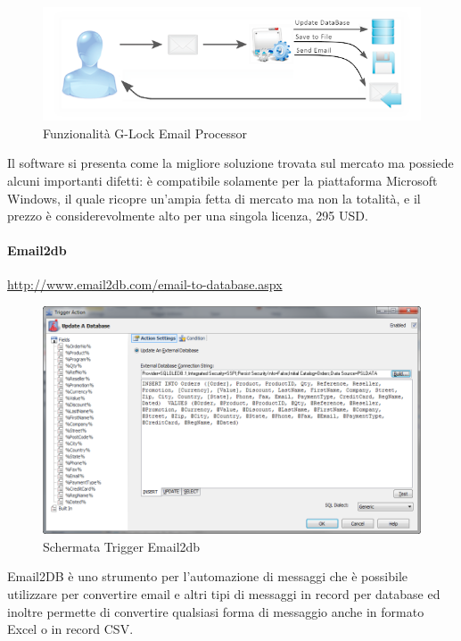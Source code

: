 \begin{figure}[H]
\centering 
\includegraphics[scale=2]{img/emailprocessor.png} 
\caption{Funzionalità G-Lock Email Processor}
\end{figure}

Il software si presenta come la migliore soluzione trovata sul mercato ma possiede alcuni importanti difetti: è compatibile solamente per la piattaforma Microsoft Windows, il quale ricopre un'ampia fetta di mercato ma non la totalità, e il prezzo è considerevolmente alto per una singola licenza, 295 USD.
\newpage

\paragraph{Email2db}
\url{http://www.email2db.com/email-to-database.aspx}

\begin{figure}[H]
\centering 
\includegraphics[scale=0.6]{img/email2db.png} 
\caption{Schermata Trigger Email2db}
\end{figure}

Email2DB è uno strumento per l'automazione di messaggi che è possibile utilizzare per convertire email e altri tipi di messaggi in record per database ed inoltre permette di convertire qualsiasi forma di messaggio anche in formato Excel o in record CSV.

